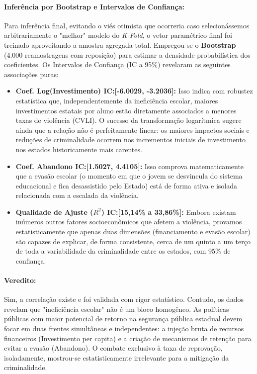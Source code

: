 \documentclass[10pt]{article}
\begin{document}
\paragraph{Inferência por Bootstrap e Intervalos de Confiança:}
Para inferência final, evitando o viés otimista que ocorreria caso selecionássemos arbitrariamente o "melhor" modelo do \textit{K-Fold}, o vetor paramétrico final foi treinado aproveitando a amostra agregada total. Empregou-se o \textbf{Bootstrap} (4.000 reamostragens com reposição) para estimar a densidade probabilística dos coeficientes. Os Intervalos de Confiança (IC a 95\%) revelaram as seguintes associações puras:
\begin{itemize}
    \item \textbf{Coef. Log(Investimento) IC:[-6.0029, -3.2036]:} Isso indica com robustez estatística que, independentemente da ineficiência escolar, maiores investimentos estatais por aluno estão diretamente associados a menores taxas de violência (CVLI). O sucesso da transformação logarítmica sugere ainda que a relação não é perfeitamente linear: os maiores impactos sociais e reduções de criminalidade ocorrem nos incrementos iniciais de investimento nos estados historicamente mais carentes.
    \item \textbf{Coef. Abandono IC:[1.5027, 4.4105]:} Isso comprova matematicamente que a evasão escolar (o momento em que o jovem se desvincula do sistema educacional e fica desassistido pelo Estado) está de forma ativa e isolada relacionada com a escalada da violência.
    \item \textbf{Qualidade de Ajuste ($R^2$) IC:[15,14\% a 33,86\%]:} Embora existam inúmeros outros fatores socioeconômicos que afetem a violência, provamos estatisticamente que apenas duas dimensões (financiamento e evasão escolar) são capazes de explicar, de forma consistente, cerca de um quinto a um terço de toda a variabilidade da criminalidade entre os estados, com 95\% de confiança.
\end{itemize}

\paragraph{Veredito:}
Sim, a correlação existe e foi validada com rigor estatístico. Contudo, os dados revelam que "ineficiência escolar" não é um bloco homogêneo. As políticas públicas com maior potencial de retorno na segurança pública estadual devem focar em duas frentes simultâneas e independentes: a injeção bruta de recursos financeiros (Investimento per capita) e a criação de mecanismos de retenção para evitar a evasão (Abandono). O combate exclusivo à taxa de reprovação, isoladamente, mostrou-se estatisticamente irrelevante para a mitigação da criminalidade.
\end{document}
